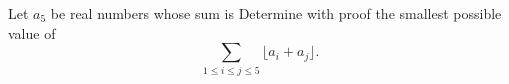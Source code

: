 Let     $a_5$ be real numbers whose sum is  Determine with proof the smallest possible value of \[ \displaystyle\sum_{1\le i \le j \le 5} \lfloor a_i + a_j \rfloor. \]